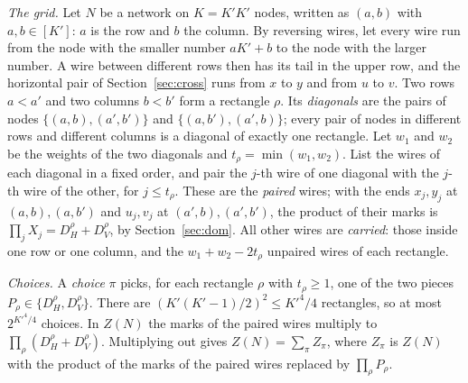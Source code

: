 \documentclass[11pt]{article}
\begin{document}
\emph{The grid.} Let $N$ be a network on $K=K'K'$ nodes, written as $(a,b)$ with $a,b\in[K']$: $a$ is the row and $b$ the column. By reversing wires, let every wire run from the node with the smaller number $aK'+b$ to the node with the larger number. A wire between different rows then has its tail in the upper row, and the horizontal pair of Section~\ref{sec:cross} runs from $x$ to $y$ and from $u$ to $v$. Two rows $a<a'$ and two columns $b<b'$ form a rectangle $\rho$. Its \emph{diagonals} are the pairs of nodes $\{(a,b),(a',b')\}$ and $\{(a,b'),(a',b)\}$; every pair of nodes in different rows and different columns is a diagonal of exactly one rectangle. Let $w_1$ and $w_2$ be the weights of the two diagonals and $t_\rho=\min(w_1,w_2)$. List the wires of each diagonal in a fixed order, and pair the $j$-th wire of one diagonal with the $j$-th wire of the other, for $j\le t_\rho$. These are the \emph{paired} wires; with the ends $x_j,y_j$ at $(a,b),(a,b')$ and $u_j,v_j$ at $(a',b),(a',b')$, the product of their marks is $\prod_jX_j=D_H^\rho+D_V^\rho$, by Section~\ref{sec:dom}. All other wires are \emph{carried}: those inside one row or one column, and the $w_1+w_2-2t_\rho$ unpaired wires of each rectangle.

\emph{Choices.} A \emph{choice} $\pi$ picks, for each rectangle $\rho$ with $t_\rho\ge1$, one of the two pieces $P_\rho\in\{D_H^\rho,D_V^\rho\}$. There are $(K'(K'-1)/2)^2\le K'^4/4$ rectangles, so at most $2^{K'^4/4}$ choices. In $Z(N)$ the marks of the paired wires multiply to $\prod_\rho(D_H^\rho+D_V^\rho)$. Multiplying out gives $Z(N)=\sum_\pi Z_\pi$, where $Z_\pi$ is $Z(N)$ with the product of the marks of the paired wires replaced by $\prod_\rho P_\rho$.
\end{document}
